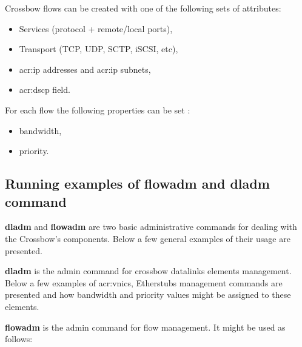 \documentclass[11pt,openany]{book}
\begin{document}
          Crossbow flows can be created with one of the following sets of attributes:

          \begin{itemize}
            \item Services (protocol + remote/local ports),
            \item Transport (TCP, UDP, SCTP, iSCSI, etc),
            \item \gls{acr:ip} addresses and \gls{acr:ip} subnets,
            \item \gls{acr:dscp} field.
          \end{itemize}

          For each flow the following properties can be set \cite{flows2}: 

          \begin{itemize}
            \item bandwidth,
            \item priority.
          \end{itemize}


      \subsection{Running examples of flowadm and dladm command}

        \textbf{dladm} and \textbf{flowadm} are two basic administrative commands for dealing with the Crossbow's
        components. Below a few general examples of their usage are presented.
  
        \textbf{dladm} is the admin command for crossbow datalinks elements management. Below a few examples of
        \gls{acr:vnic}s, Etherstubs management commands are presented and how bandwidth and priority values might be
        assigned to these elements. \\

        \noindent
        \begin{minipage}{\textwidth}
          
        \end{minipage}

        \textbf{flowadm} is the admin command for flow management. It might be used as follows: \\

        \noindent
        \begin{minipage}{\textwidth}
          
        \end{minipage}
\end{document}
